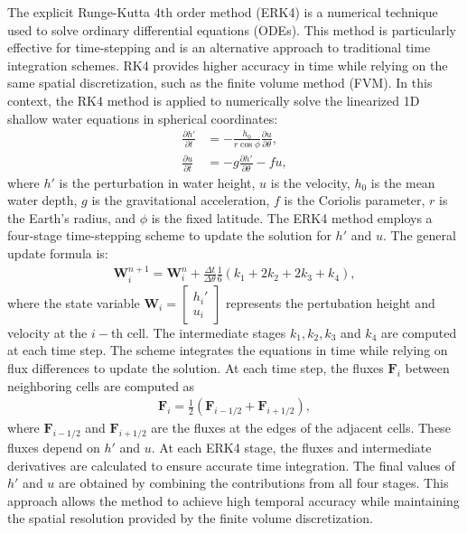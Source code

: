 The explicit Runge-Kutta 4th order method (ERK4) is a numerical technique used to solve ordinary differential equations (ODEs).
This method is particularly effective for time-stepping and is an alternative approach to traditional time integration schemes.
RK4 provides higher accuracy in time while relying on the same spatial discretization, such as the finite volume method (FVM).
In this context, the RK4 method is applied to numerically solve the linearized 1D shallow water equations in spherical coordinates:
\begin{subequations}
    \begin{align}
        \frac{\partial h'}{\partial t} &= -\frac{h_0}{r \cos\phi} \frac{\partial u}{\partial \theta}, \\
        \frac{\partial u}{\partial t} &= -g \frac{\partial h'}{\partial \theta} - f u,
    \end{align}
\end{subequations}
where \(h'\) is the perturbation in water height, \(u\) is the velocity, \(h_0\) is the mean water depth, \(g\) is the gravitational acceleration, \(f\) is the Coriolis parameter, \(r\) is the Earth's radius, and \(\phi\) is the fixed latitude. 
The ERK4 method employs a four-stage time-stepping scheme to update the solution for $h'$ and $u$.
The general update formula is:
\begin{align*}
    \mathbf{W}_i^{n+1} = \mathbf{W}_i^n + \frac{\Delta t}{\Delta \theta} \frac{1}{6} \left(k_1 + 2 k_2 + 2 k_3 + k_4 \right),
\end{align*}
where the state variable
$\mathbf{W}_i = \begin{bmatrix}
    h_i' \\
    u_i
\end{bmatrix}$ represents the pertubation height and velocity at the $i-$th cell.
The intermediate stages $k_1, k_2, k_3$ and $k_4$ are computed at each time step.
The scheme integrates the equations in time while relying on flux differences to update the solution.
At each time step, the fluxes $\mathbf{F}_i$ between neighboring cells are computed as
\begin{align*}
    \mathbf{F}_i = \frac{1}{2}(\mathbf{F}_{i-1/2} + \mathbf{F}_{i+1/2}),
\end{align*}
where $\mathbf{F}_{i-1/2}$ and $\mathbf{F}_{i+1/2}$ are the fluxes at the edges of the adjacent cells.
These fluxes depend on $h'$ and $u$.
At each ERK4 stage, the fluxes and intermediate derivatives are calculated to ensure accurate time integration.
The final values of $h'$ and $u$ are obtained by combining the contributions from all four stages.
This approach allows the method to achieve high temporal accuracy while maintaining the spatial resolution provided by the finite volume discretization.

